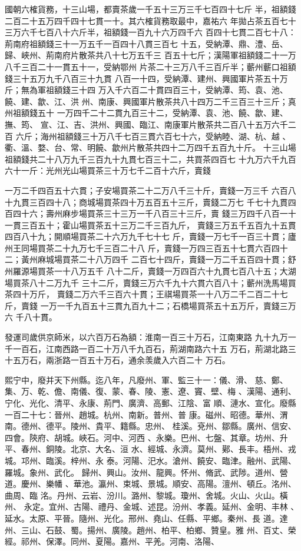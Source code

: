 \documentclass{ctexart}
\begin{document}
國朝六榷貨務，十三山場，都賣茶歲一千五十三万三千七百四十七斤 半，祖額錢二百二十五万四千四十七貫一十。其六榷貨務取最中，嘉祐六 年拋占茶五百七十三万六千七百八十六斤半，祖額錢一百九十六万四千六 百四十七貫二百七十八：荊南府祖額錢三十一万五千一百四十八貫三百七 十五，受納潭、鼎、澧、岳、歸、峽州、荊南府片散茶共八十七万五千三 百五十七斤；漢陽軍祖額錢二十一万八千三百二十一貫五十一，受納鄂州 片茶二十三万八千三百斤半；蘄州蘄口祖額錢三十五万九千八百三十九貫 八百一十四，受納潭、建州、興國軍片茶五十万斤；無為軍祖額錢三十四 万入千六百二十貫四百三十，受納潭、筠、袁、池、饒、建、歙、江、洪 州、南康、興國軍片散茶共八十四万二千三百三十三斤；真州祖額錢五十 一万四千二十二貫九百三十二，受納潭、袁、池、饒、歙、建、撫、筠、 宣、江、吉、洪州、興國、臨江、南康軍片散茶共二百八十五万六千二百 六斤；海州祖額錢三十万八千七百三貫六百七十六，受納睦、湖、杭、越 、衢、溫、婺、台、常、明饒、歙州片散茶共四十二万四千五百九十斤。 十三山場祖額錢共二十八万九千三百九十九貫七百三十二，共買茶四百七 十九万六千九百六十一斤：光州光山場買茶三十万七千二百十六斤，賣錢

一万二千四百五十六貫；子安場買茶二十二万八千三十斤，賣錢一万三千 六百八十九貫三百四十八；商城場買茶四十万五百五十三斤，賣錢二万七 千七十九貫四百四十六；壽州麻步場買茶三十三万一千八百三十三斤，賣 錢三万四千八百一十一貫三百五十；霍山場買茶五十三万二千三百九斤， 賣錢三万五千五百九十五貫四百八十九；開順場買茶二十六万九千七十七 斤，賣錢一万七千一百三十貫；廬州王同場買茶二十九万七千三百二十八 斤，賣錢一万四三百五十七貫六百四十二；黃州麻城場買茶二十八万四千 二百七十四斤，賣錢一万二千五百四十貫；舒州羅源場買茶一十八万五千 八十二斤，賣錢一万四百六十九貫七百八十五；大湖場買茶八十二万九千 三十二斤，賣錢三万六千九十六貫六百八十；蘄州洗馬場買茶四十万斤， 賣錢二万六千三百六十貫；王祺場買茶一十八万二千二百二十七斤，賣錢 一万一千九百五十三貫九百九十二；石橋場買茶五十五万斤，賣錢三万六 千八十貫。

發運司歲供京師米，以六百万石為額：淮南一百三十万石，江南東路 九十九万一千一百石，江南西路一百二十万八千九百石，荊湖南路六十五 万石，荊湖北路三十五万石，兩浙路一百五十万石，通余羡歲入六百二十 万石。

熙宁中，廢并天下州縣。迄八年，凡廢州、軍、監三十一：儀、滑、 慈、鄭、集、万、乾、儋、南儀、復、蒙、春、陵、憲、遼、竇、壁、梅 、漢陽、通利、宁化、光化、清平、永康、荊門、廣濟、高郵、江陰、富 順、漣水、宣化。廢縣一百二十七：晉州、趙城。杭州、南新。普州、普 康。磁州、昭德。華州、渭南。德州、德平。陵州、貴平、籍縣。忠州、 桂溪。兗州、鄒縣。廣州、信安、四會。陝府、胡城。峽石。河中、河西 、永樂。巴州、七盤、其章。坊州、升平、春州、銅陵。北京、大名、洹 水、經城、永濟。莫州、鄚、長丰。梧州、戎城。邛州、臨溪。梓州、永 泰。河陽、汜水。滄州、饒安、臨津。融州、武陽、羅城。象州、武化。 歸州、興山。汝州、龍興。怀州、脩武、武陟。道州、營道。慶州、樂幡 、華池。瀛州、束城、景城。順安、高陽。澶州、頓丘。洺州、曲周、臨 洺。丹州、云岩、汾川。潞州、黎城。瓊州、舍城。火山、火山。橫州、 永定。宜州、古陽、禮丹、金城、述昆。汾州、孝義。延州、金明、丰林 、延水。太原、平晉。隨州、光化。邢州、堯山、任縣、平鄉。秦州、長 道。達州、三山、石鼓、蜀。揚州、廣陵。趙州、柏平、柏鄉、贊皇。雅 州、百丈、榮經。祁州、保澤。同州、夏陽。嘉州、平羌。河南、洛陽、
\end{document}
